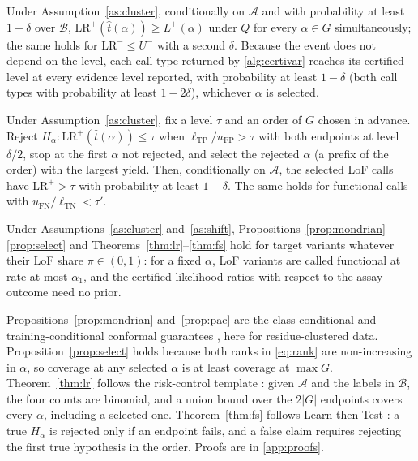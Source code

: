 \begin{theorem}\label{thm:lr}
Under Assumption~\ref{as:cluster}, conditionally on $\mathcal A$ and with probability at least $1-\delta$ over
$\mathcal B$, $\mathrm{LR}^+(\hat t(\alpha))\ge L^+(\alpha)$ under $Q$ for every $\alpha\in G$ simultaneously; the same
holds for $\mathrm{LR}^-\le U^-$ with a second $\delta$. Because the event does not depend on the level, each call type
returned by \cref{alg:certivar} reaches its certified level at every evidence level reported, with probability at least
$1-\delta$ (both call types with probability at least $1-2\delta$), whichever $\alpha$ is selected.
\end{theorem}

\begin{theorem}\label{thm:fs}
Under Assumption~\ref{as:cluster}, fix a level $\tau$ and an order of $G$ chosen in advance. Reject $H_\alpha:
\mathrm{LR}^+(\hat t(\alpha))\le\tau$ when $\ell_{\mathrm{TP}}/u_{\mathrm{FP}}>\tau$ with both endpoints at level
$\delta/2$, stop at the first $\alpha$ not rejected, and select the rejected $\alpha$ (a prefix of the order) with the largest yield. Then,
conditionally on $\mathcal A$, the selected LoF calls have $\mathrm{LR}^+>\tau$ with probability at least $1-\delta$.
The same holds for functional calls with $u_{\mathrm{FN}}/\ell_{\mathrm{TN}}<\tau'$.
\end{theorem}

\begin{corollary}\label{cor:shift}
Under Assumptions~\ref{as:cluster} and~\ref{as:shift}, Propositions~\ref{prop:mondrian}--\ref{prop:select} and
Theorems~\ref{thm:lr}--\ref{thm:fs} hold for target variants whatever their LoF share $\pi\in(0,1)$: for a fixed
$\alpha$, LoF variants are called functional at rate at most $\alpha_1$, and the certified likelihood ratios with
respect to the assay outcome need no prior.
\end{corollary}

Propositions~\ref{prop:mondrian} and~\ref{prop:pac} are the class-conditional and training-conditional conformal
guarantees \cite{Vovk2005,Sadinle2019,Vovk2013,Tong2018}, here for residue-clustered data. Proposition~\ref{prop:select}
holds because both ranks in \eqref{eq:rank} are non-increasing in $\alpha$, so coverage at any selected $\alpha$ is at
least coverage at $\max G$. Theorem~\ref{thm:lr} follows the risk-control template \cite{Bates2021rcps}: given
$\mathcal A$ and the labels in $\mathcal B$, the four counts are binomial, and a union bound over the $2|G|$
endpoints covers every $\alpha$, including a selected one. Theorem~\ref{thm:fs} follows Learn-then-Test
\cite{Angelopoulos2025ltt}: a true $H_\alpha$ is rejected only if an endpoint fails, and a false claim requires
rejecting the first true hypothesis in the order. Proofs are in \cref{app:proofs}.


